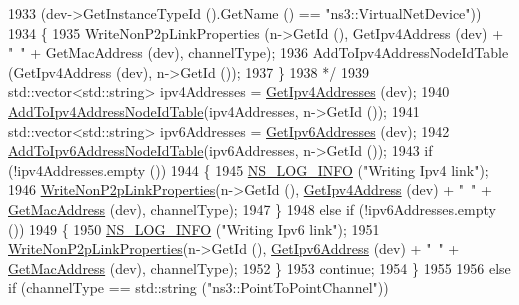 \begin{DoxyCode}
{}
1933 \textcolor{comment}{                  (dev->GetInstanceTypeId ().GetName () == "ns3::VirtualNetDevice"))
}
1934 \textcolor{comment}{                \{
}
1935 \textcolor{comment}{                  WriteNonP2pLinkProperties (n->GetId (), GetIpv4Address (dev) + "~" + GetMacAddress (dev),
       channelType);
}
1936 \textcolor{comment}{                  AddToIpv4AddressNodeIdTable (GetIpv4Address (dev), n->GetId ());
}
1937 \textcolor{comment}{                \}
}
1938 \textcolor{comment}{               */}
1939               std::vector<std::string> ipv4Addresses = \hyperlink{classns3_1_1AnimationInterface_a73dca227bb2e3986b1ccfd83cdea2a4c}{GetIpv4Addresses} (dev);
1940               \hyperlink{classns3_1_1AnimationInterface_a6393d37e753d3445d8915a4f3bc748c7}{AddToIpv4AddressNodeIdTable}(ipv4Addresses, n->GetId ());
1941               std::vector<std::string> ipv6Addresses = \hyperlink{classns3_1_1AnimationInterface_a6cb3ba286e8b93b93b1ef1e79ce4ee0e}{GetIpv6Addresses} (dev);
1942               \hyperlink{classns3_1_1AnimationInterface_a77ab25cf252dc135989298d9c96d452b}{AddToIpv6AddressNodeIdTable}(ipv6Addresses, n->GetId ());
1943               \textcolor{keywordflow}{if} (!ipv4Addresses.empty ())
1944                 \{
1945                    \hyperlink{group__logging_gafbd73ee2cf9f26b319f49086d8e860fb}{NS\_LOG\_INFO} (\textcolor{stringliteral}{"Writing Ipv4 link"});
1946                    \hyperlink{classns3_1_1AnimationInterface_a7b7b440a439803c362f86201dd36d091}{WriteNonP2pLinkProperties}(n->GetId (), 
      \hyperlink{classns3_1_1AnimationInterface_af000d578afa61b609866889aa38c4663}{GetIpv4Address} (dev) + \textcolor{stringliteral}{"~"} + \hyperlink{classns3_1_1AnimationInterface_a82c8e06d9c44523db90adb5424c08806}{GetMacAddress} (dev), channelType);
1947                 \}
1948               \textcolor{keywordflow}{else} \textcolor{keywordflow}{if} (!ipv6Addresses.empty ())
1949                 \{
1950                   \hyperlink{group__logging_gafbd73ee2cf9f26b319f49086d8e860fb}{NS\_LOG\_INFO} (\textcolor{stringliteral}{"Writing Ipv6 link"});
1951                   \hyperlink{classns3_1_1AnimationInterface_a7b7b440a439803c362f86201dd36d091}{WriteNonP2pLinkProperties}(n->GetId (), 
      \hyperlink{classns3_1_1AnimationInterface_a89512d6e59613518d1b880e81ab6db1b}{GetIpv6Address} (dev) + \textcolor{stringliteral}{"~"} + \hyperlink{classns3_1_1AnimationInterface_a82c8e06d9c44523db90adb5424c08806}{GetMacAddress} (dev), channelType);
1952                 \}
1953               \textcolor{keywordflow}{continue};
1954             \}
1955 
1956          \textcolor{keywordflow}{else} \textcolor{keywordflow}{if} (channelType == std::string (\textcolor{stringliteral}{"ns3::PointToPointChannel"}))

\end{DoxyCode}
